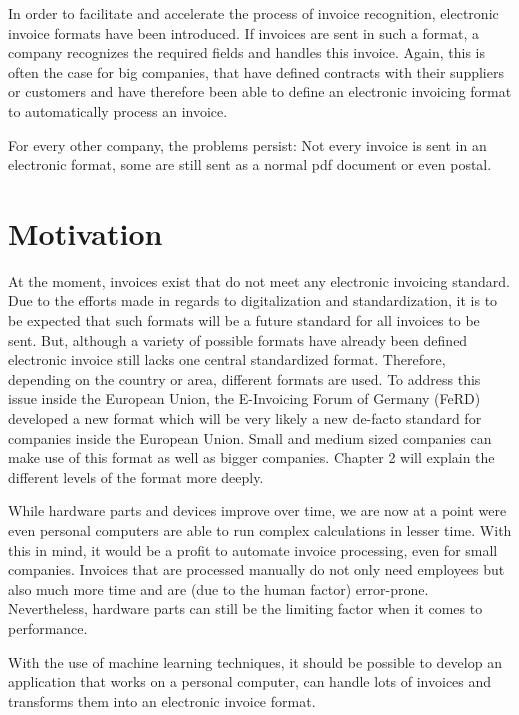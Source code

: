 In order to facilitate and accelerate the process of invoice recognition, electronic invoice formats have been introduced. If invoices are sent in such a format, a company recognizes the required fields and handles this invoice. Again, this is often the case for big companies, that have defined contracts with their suppliers or customers and have therefore been able to define an electronic invoicing format to automatically process an invoice.

For every other company, the problems persist: Not every invoice is sent in an electronic format, some are still sent as a normal pdf document or even postal.

\section{Motivation}
\label{sec1.2}

At the moment, invoices exist that do not meet any electronic invoicing standard. Due to the efforts made in regards to digitalization and standardization, it is to be expected that such formats will be a future standard for all invoices to be sent. But, although a variety of possible formats have already been defined electronic invoice still lacks one central standardized format.
Therefore, depending on the country or area, different formats are used. To address this issue inside the European Union, the E-Invoicing Forum of Germany (FeRD) developed a new format which will be very likely a new de-facto standard for companies inside the European Union. Small and medium sized companies can make use of this format as well as bigger companies. Chapter 2 will explain the different levels of the format more deeply.

While hardware parts and devices improve over time, we are now at a point were even personal computers are able to run complex calculations in lesser time. With this in mind, it would be a profit to automate invoice processing, even for small companies. Invoices that are processed manually do not only need employees but also much more time and are (due to the human factor) error-prone. Nevertheless, hardware parts can still be the limiting factor when it comes to performance.

With the use of machine learning techniques, it should be possible to develop an application that works on a personal computer, can handle lots of invoices and transforms them into an electronic invoice format.

